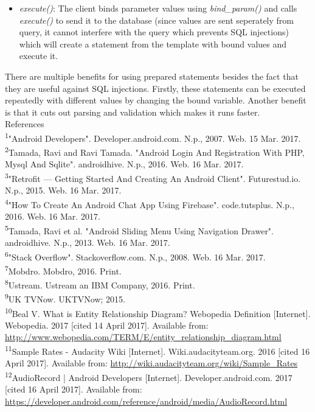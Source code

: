 \documentclass{article}
\begin{document}
\begin{flushleft}
\begin{itemize}
	\item \textit{execute()}: The client binds parameter values using \textit{bind\_param()} and calls \textit{execute()} to send it to the database (since values are sent seperately from query, it cannot interfere with the query which prevents SQL injections) which will create a statement from the template with bound values and execute it.
\end{itemize}
There are multiple benefits for using prepared statements besides the fact that they are useful against SQL injections. Firstly, these statements can be executed repeatedly with different values by changing the bound variable. Another benefit is that it cuts out parsing and validation which makes it runs faster.\\
{\huge References}\\[0.5cm]
\textsuperscript{1}"Android Developers". Developer.android.com. N.p., 2007. Web. 15 Mar. 2017.\\
\textsuperscript{2}Tamada, Ravi and Ravi Tamada. "Android Login And Registration With PHP, Mysql And Sqlite". androidhive. N.p., 2016. Web. 16 Mar. 2017.\\
\textsuperscript{3}"Retrofit — Getting Started And Creating An Android Client". Futurestud.io. N.p., 2015. Web. 16 Mar. 2017.\\
\textsuperscript{4}"How To Create An Android Chat App Using Firebase". code.tutsplus. N.p., 2016. Web. 16 Mar. 2017.\\
\textsuperscript{5}Tamada, Ravi et al. "Android Sliding Menu Using Navigation Drawer". androidhive. N.p., 2013. Web. 16 Mar. 2017.\\
\textsuperscript{6}"Stack Overflow". Stackoverflow.com. N.p., 2008. Web. 16 Mar. 2017.\\
\textsuperscript{7}Mobdro. Mobdro, 2016. Print.\\
\textsuperscript{8}Ustream. Ustream an IBM Company, 2016. Print.\\
\textsuperscript{9}UK TVNow. UKTVNow; 2015. \\
\textsuperscript{10}Beal V. What is Entity Relationship Diagram? Webopedia Definition [Internet]. Webopedia. 2017 [cited 14 April 2017]. Available from: \url {http://www.webopedia.com/TERM/E/entity_relationship_diagram.html}\\
\textsuperscript{11}Sample Rates - Audacity Wiki [Internet]. Wiki.audacityteam.org. 2016 [cited 16 April 2017]. Available from: \url{http://wiki.audacityteam.org/wiki/Sample_Rates}\\
\textsuperscript{12}AudioRecord | Android Developers [Internet]. Developer.android.com. 2017 [cited 16 April 2017]. Available from: \url{https://developer.android.com/reference/android/media/AudioRecord.html}\\

\end{flushleft}
\end{document}
